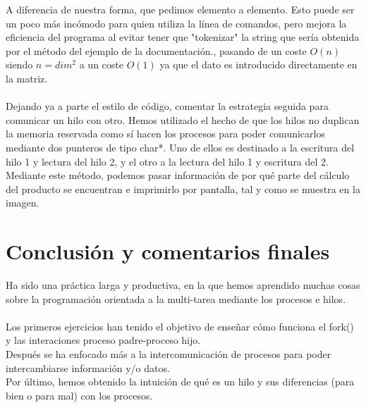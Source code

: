 \documentclass[12pt]{article}
\begin{document}
A diferencia de nuestra forma, que pedimos elemento a elemento. Esto puede ser un poco más incómodo para quien utiliza la línea de comandos, pero mejora la eficiencia del programa al evitar tener que "tokenizar" la string que sería obtenida por el método del ejemplo de la documentación., pasando de un coste $O(n)$ siendo $n = dim^2$ a un coste $O(1)$ ya que el dato es introducido directamente en la matriz.\\\\ Dejando ya a parte el estilo de código, comentar la estrategia seguida para comunicar un hilo con otro. Hemos utilizado el hecho de que los hilos no duplican la memoria reservada como sí hacen los procesos para poder comunicarlos mediante dos punteros de tipo char*. Uno de ellos es destinado a la escritura del hilo 1 y lectura del hilo 2, y el otro a la lectura del hilo 1 y escritura del 2.\\ Mediante este método, podemos pasar información de por qué parte del cálculo del producto se encuentran e imprimirlo por pantalla, tal y como se muestra en la imagen.



\section{Conclusión y comentarios finales}
Ha sido una práctica larga y productiva, en la que hemos aprendido muchas cosas sobre la programación orientada a la multi-tarea mediante los procesos e hilos.\\\\
Los primeros ejercicios han tenido el objetivo de enseñar cómo funciona el fork() y las interaciones proceso padre-proceso hijo.\\ Después se ha enfocado más a la intercomunicación de procesos para poder intercambiarse información y/o datos.\\ Por último, hemos obtenido la intuición de qué es un hilo y sus diferencias (para bien o para mal) con los procesos.
\end{document}
